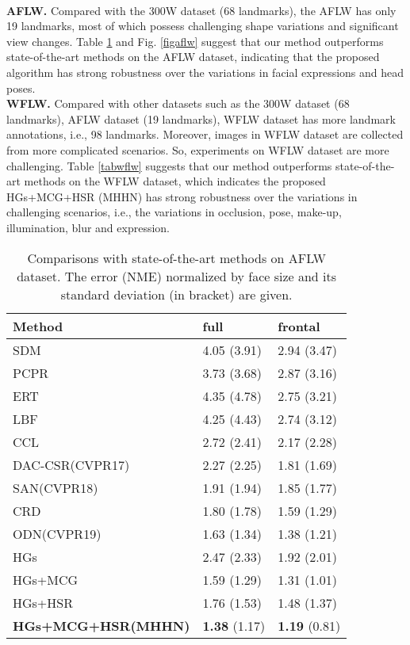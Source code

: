 \documentclass[journal]{IEEEtran}
\begin{document}
\\\indent\textbf{AFLW.} Compared with the 300W dataset (68 landmarks), the AFLW has only 19 landmarks, most of which possess challenging shape variations and significant view changes. Table \ref{tabaflw} and Fig. \ref{figaflw} suggest that our method outperforms state-of-the-art methods on the AFLW dataset, indicating that the proposed algorithm has strong robustness over the variations in facial expressions and head poses.
\\\indent\textbf{WFLW.} Compared with other datasets such as the 300W dataset (68 landmarks), AFLW dataset (19 landmarks), WFLW dataset has more landmark annotations, i.e., 98 landmarks. Moreover, images in WFLW dataset are collected from more complicated scenarios. So, experiments on WFLW dataset are more challenging. Table \ref{tabwflw} suggests that our method outperforms state-of-the-art methods on the WFLW dataset, which indicates the proposed HGs+MCG+HSR (MHHN) has strong robustness over the variations in challenging scenarios, i.e., the variations in occlusion, pose, make-up, illumination, blur and expression.
\begin{table}
	\caption{Comparisons with state-of-the-art methods on AFLW dataset. The error (NME) normalized by face size and its standard deviation (in bracket) are given.}
	\begin{center}
		\begin{tabular}{p{3.8cm}p{1.6cm}p{1.6cm}}
			\hline
			Method & full & frontal \\
			\hline
			SDM\cite{xiong2013supervised}&	4.05 (3.91)&	2.94 (3.47)\\
			PCPR\cite{Burgosartizzu2013Robust} & 3.73 (3.68) & 2.87 (3.16)  \\
			ERT\cite{Kazemi2014OneMF}&	4.35 (4.78)&	2.75 (3.21)\\
			LBF\cite{ren2014face} & 4.25 (4.43) & 2.74 (3.12)   \\
			CCL\cite{Zhu2016UnconstrainedFA}&	2.72 (2.41)&	2.17 (2.28)\\
			DAC-CSR(CVPR17)\cite{Feng2017DynamicAC}&	2.27 (2.25)&	1.81 (1.69)\\
			SAN\cite{Dong2018StyleAN}(CVPR18)&	1.91 (1.94)&	1.85 (1.77)\\
			CRD\cite{wan2020robust}&1.80 (1.78) &1.59 (1.29)\\
			ODN\cite{Zhu2019RobustFL}(CVPR19)&	1.63 (1.34)&	1.38 (1.21)\\
			\hline
				HGs&	2.47 (2.33)  &	1.92 (2.01)\\
			HGs+MCG&	1.59 (1.29)  &	1.31 (1.01)\\
			HGs+HSR&	1.76 (1.53)  &	1.48 (1.37)\\	
			\textbf{HGs+MCG+HSR(MHHN)} &	\textbf{1.38} (1.17)&	\textbf{1.19} (0.81) \\
			\hline
		\end{tabular}
	\end{center}
	\label{tabaflw}
\end{table}
\end{document}
